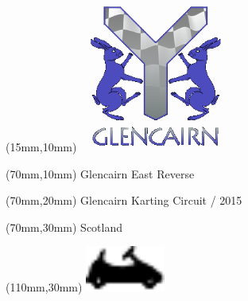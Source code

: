 \null\newpage
\begin{textblock*}{50mm}(15mm,10mm)%
\includegraphics[width=50mm]{LG/GLE.png}
\end{textblock*}
\begin{textblock*}{130mm}(70mm,10mm)%
{\fontsize{20}{20}\selectfont Glencairn East Reverse}\\
\end{textblock*}
\begin{textblock*}{120mm}(70mm,20mm)%
{\fontsize{16}{16}\selectfont Glencairn Karting Circuit / 2015}\\
\end{textblock*}
\begin{textblock*}{120mm}(70mm,30mm)%
{\fontsize{12}{12}\selectfont Scotland}
\end{textblock*}
\begin{textblock*}{30mm}(110mm,30mm)%
\centering
\includegraphics[height=15mm]{icons/kart.pdf}
\end{textblock*}
